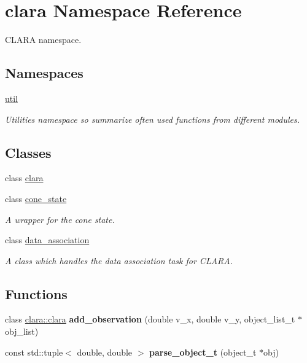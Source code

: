 \hypertarget{namespaceclara}{}\section{clara Namespace Reference}
\label{namespaceclara}


C\+L\+A\+RA namespace.  


\subsection*{Namespaces}
\begin{DoxyCompactItemize}
\item 
 \hyperlink{namespaceclara_1_1util}{util}
\begin{DoxyCompactList}\small\item\em Utilities namespace so summarize often used functions from different modules. \end{DoxyCompactList}\end{DoxyCompactItemize}
\subsection*{Classes}
\begin{DoxyCompactItemize}
\item 
class \hyperlink{classclara_1_1clara}{clara}
\item 
class \hyperlink{classclara_1_1cone__state}{cone\+\_\+state}
\begin{DoxyCompactList}\small\item\em A wrapper for the cone state. \end{DoxyCompactList}\item 
class \hyperlink{classclara_1_1data__association}{data\+\_\+association}
\begin{DoxyCompactList}\small\item\em A class which handles the data association task for C\+L\+A\+RA. \end{DoxyCompactList}\end{DoxyCompactItemize}
\subsection*{Functions}
\begin{DoxyCompactItemize}
\item 
class \hyperlink{classclara_1_1clara}{clara\+::clara} {\bfseries add\+\_\+observation} (double v\+\_\+x, double v\+\_\+y, object\+\_\+list\+\_\+t $\ast$obj\+\_\+list)
\item 
const std\+::tuple$<$ double, double $>$ {\bfseries parse\+\_\+object\+\_\+t} (object\+\_\+t $\ast$obj)
\end{DoxyCompactItemize}
